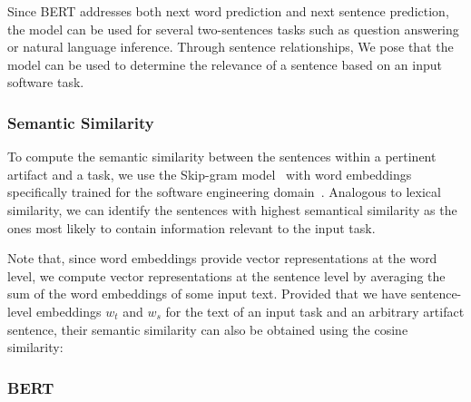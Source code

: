 Since BERT addresses both next word prediction and next sentence prediction, the model can be used for several two-sentences tasks such as  question answering or natural language inference. Through sentence relationships, 
We pose that the model can be used to determine the relevance of a sentence based on an input software task.





\subsubsection{Semantic Similarity}






To compute the semantic similarity between the sentences within a pertinent artifact and a task,
we use the Skip-gram model~\cite{Mikolov2013} with word embeddings specifically trained for the software engineering domain~\cite{Efstathiou2018}.
Analogous to lexical similarity,  we can identify the sentences with highest semantical similarity 
as the ones most likely to contain information relevant to the input task.



Note that, since word embeddings provide vector representations at the word level, we compute vector representations 
at the sentence level by averaging the sum of the word embeddings of some input text.
Provided that we have sentence-level embeddings $w_t$ and $w_s$ for the text 
of an input task and an arbitrary artifact sentence, 
their semantic similarity can also be obtained 
using the cosine similarity: 





\subsubsection{BERT}











